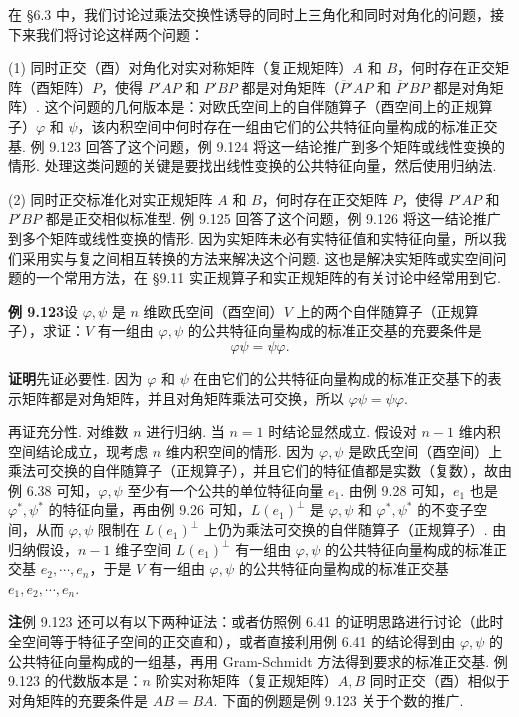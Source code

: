 \documentclass[UTF8,12pt,a4paper,fontset=fandol]{ctexart}
\begin{document}
在 §6.3 中，我们讨论过乘法交换性诱导的同时上三角化和同时对角化的问题，接下来我们将讨论这样两个问题：

(1) 同时正交（酉）对角化\quad 对实对称矩阵（复正规矩阵）$A$ 和 $B$，何时存在正交矩阵（酉矩阵）$P$，使得 $P'AP$ 和 $P'BP$ 都是对角矩阵（$\overline{P}'AP$ 和 $\overline{P}'BP$ 都是对角矩阵）. 这个问题的几何版本是：对欧氏空间上的自伴随算子（酉空间上的正规算子）$\varphi$ 和 $\psi$，该内积空间中何时存在一组由它们的公共特征向量构成的标准正交基. 例 9.123 回答了这个问题，例 9.124 将这一结论推广到多个矩阵或线性变换的情形. 处理这类问题的关键是要找出线性变换的公共特征向量，然后使用归纳法.

(2) 同时正交标准化\quad 对实正规矩阵 $A$ 和 $B$，何时存在正交矩阵 $P$，使得 $P'AP$ 和 $P'BP$ 都是正交相似标准型. 例 9.125 回答了这个问题，例 9.126 将这一结论推广到多个矩阵或线性变换的情形. 因为实矩阵未必有实特征值和实特征向量，所以我们采用实与复之间相互转换的方法来解决这个问题. 这也是解决实矩阵或实空间问题的一个常用方法，在 §9.11 实正规算子和实正规矩阵的有关讨论中经常用到它.

\noindent\textbf{例 9.123}\quad 设 $\varphi,\psi$ 是 $n$ 维欧氏空间（酉空间）$V$ 上的两个自伴随算子（正规算子），求证：$V$ 有一组由 $\varphi,\psi$ 的公共特征向量构成的标准正交基的充要条件是
\[
\varphi\psi=\psi\varphi.
\]

\noindent\textbf{证明}\quad 先证必要性. 因为 $\varphi$ 和 $\psi$ 在由它们的公共特征向量构成的标准正交基下的表示矩阵都是对角矩阵，并且对角矩阵乘法可交换，所以 $\varphi\psi=\psi\varphi$.

再证充分性. 对维数 $n$ 进行归纳. 当 $n=1$ 时结论显然成立. 假设对 $n-1$ 维内积空间结论成立，现考虑 $n$ 维内积空间的情形. 因为 $\varphi,\psi$ 是欧氏空间（酉空间）上乘法可交换的自伴随算子（正规算子），并且它们的特征值都是实数（复数），故由例 6.38 可知，$\varphi,\psi$ 至少有一个公共的单位特征向量 $e_1$. 由例 9.28 可知，$e_1$ 也是 $\varphi^*,\psi^*$ 的特征向量，再由例 9.26 可知，$L(e_1)^\perp$ 是 $\varphi,\psi$ 和 $\varphi^*,\psi^*$ 的不变子空间，从而 $\varphi,\psi$ 限制在 $L(e_1)^\perp$ 上仍为乘法可交换的自伴随算子（正规算子）. 由归纳假设，$n-1$ 维子空间 $L(e_1)^\perp$ 有一组由 $\varphi,\psi$ 的公共特征向量构成的标准正交基 $e_2,\cdots,e_n$，于是 $V$ 有一组由 $\varphi,\psi$ 的公共特征向量构成的标准正交基 $e_1,e_2,\cdots,e_n$.

\noindent\textbf{注}\quad 例 9.123 还可以有以下两种证法：或者仿照例 6.41 的证明思路进行讨论（此时全空间等于特征子空间的正交直和），或者直接利用例 6.41 的结论得到由 $\varphi,\psi$ 的公共特征向量构成的一组基，再用 Gram-Schmidt 方法得到要求的标准正交基. 例 9.123 的代数版本是：$n$ 阶实对称矩阵（复正规矩阵）$A,B$ 同时正交（酉）相似于对角矩阵的充要条件是 $AB=BA$. 下面的例题是例 9.123 关于个数的推广.
\end{document}
